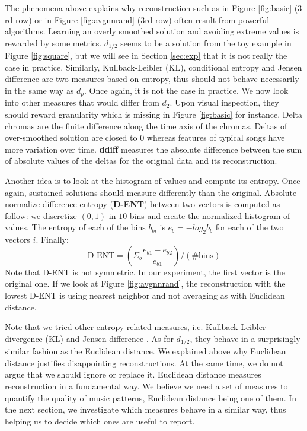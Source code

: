 \documentclass{article}
\begin{document}
The phenomena above explains why reconstruction such as in Figure
\ref{fig:basic} ($3$rd row) or in Figure \ref{fig:avgnnrand} ($3$rd
row) often result from powerful algorithms. Learning an overly
smoothed solution and avoiding extreme values is rewarded by some
metrics. $d_{1/2}$ seems to be a solution from the toy example in
Figure \ref{fig:square}, but we will see in Section \ref{sec:exp} that
it is not really the case in practice.  Similarly, Kullback-Leibler
(KL), conditional entropy and Jensen difference \cite{Michel1994} are
two measures based on entropy, thus should not behave necessarily in
the same way as $d_p$.  Once again, it is not the case in practice. We
now look into other measures that would differ from $d_2$.  Upon
visual inspection, they should reward granularity which is missing in
Figure \ref{fig:basic} for instance. Delta chromas are the finite
difference along the time axis of the chromas. Deltas of over-smoothed
solution are closed to $0$ whereas features of typical songs have more
variation over time.
\textbf{ddiff} measures the absolute difference between the
sum of absolute values of the deltas for the original data and its
reconstruction.

Another idea is to look at the histogram of values and compute its
entropy. Once again, sustained solutions should measure differently
than the original.  Absolute normalize difference entropy
(\textbf{D-ENT}) \cite{Mentzelopoulos2004} between two vectors is
computed as follow: we discretize $(0,1)$ in $10$ bins and create the
normalized histogram of values.  The entropy of each of the bins
$b_{bi}$ is $e_b = - log_2 b_b$ for each of the two vectors
$i$. Finally:
\[
\mbox{D-ENT} = \left( \Sigma_b \frac{e_{b1} - e_{b2}}{e_{b1}} \right) / (\mbox{\# bins})
\]
Note that D-ENT is not symmetric. In our experiment, the first vector
is the original one.  If we look at Figure \ref{fig:avgnnrand}, the
reconstruction with the lowest D-ENT is using nearest neighbor and not
averaging as with Euclidean distance.

Note that we tried other entropy related measures,
i.e. Kullback-Leibler divergence (KL) and Jensen difference
\cite{Michel1994}. As for $d_{1/2}$, they behave in a surprisingly
similar fashion as the Euclidean distance.  We explained above why
Euclidean distance justifies disappointing reconstructions. At the
same time, we do not argue that we should ignore or replace
it. Euclidean distance measures reconstruction in a fundamental
way. We believe we need a set of measures to quantify the quality of
music patterns, Euclidean distance being one of them. In the next
section, we investigate which measures behave in a similar way, thus
helping us to decide which ones are useful to report.
\end{document}
